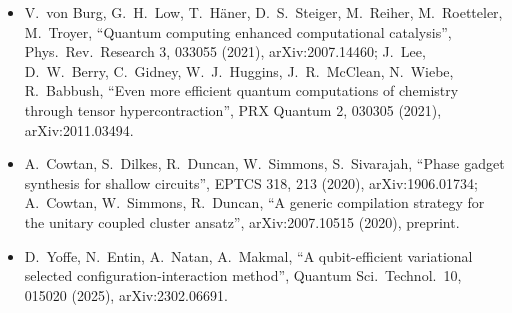 \documentclass[11pt,a4paper]{article}
\begin{document}
\begin{itemize}
\item V.~von Burg, G.~H.~Low, T.~H\"aner, D.~S.~Steiger, M.~Reiher, M.~Roetteler, M.~Troyer, ``Quantum computing enhanced computational catalysis'', Phys.\ Rev.\ Research 3, 033055 (2021), arXiv:2007.14460; J.~Lee, D.~W.~Berry, C.~Gidney, W.~J.~Huggins, J.~R.~McClean, N.~Wiebe, R.~Babbush, ``Even more efficient quantum computations of chemistry through tensor hypercontraction'', PRX Quantum 2, 030305 (2021), arXiv:2011.03494.
\item A.~Cowtan, S.~Dilkes, R.~Duncan, W.~Simmons, S.~Sivarajah, ``Phase gadget synthesis for shallow circuits'', EPTCS 318, 213 (2020), arXiv:1906.01734; A.~Cowtan, W.~Simmons, R.~Duncan, ``A generic compilation strategy for the unitary coupled cluster ansatz'', arXiv:2007.10515 (2020), preprint.
\item D.~Yoffe, N.~Entin, A.~Natan, A.~Makmal, ``A qubit-efficient variational selected configuration-interaction method'', Quantum Sci.\ Technol.\ 10, 015020 (2025), arXiv:2302.06691.
\end{itemize}
\end{document}
